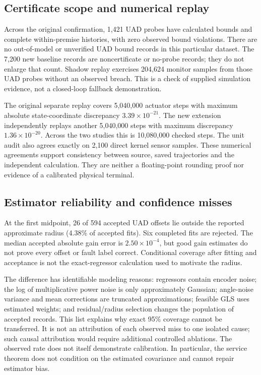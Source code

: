 \subsection{Certificate scope and numerical replay}
Across the original confirmation, 1,421 UAD probes have calculated bounds and complete within-premise histories, with zero observed bound violations. There are no out-of-model or unverified UAD bound records in this particular dataset. The 7,200 new baseline records are noncertificate or no-probe records; they do not enlarge that count. Shadow replay exercises 204,624 monitor samples from those UAD probes without an observed breach. This is a check of supplied simulation evidence, not a closed-loop fallback demonstration.

The original separate replay covers 5,040,000 actuator steps with maximum absolute state-coordinate discrepancy $3.39\times10^{-21}$. The new extension independently replays another 5,040,000 steps with maximum discrepancy $1.36\times10^{-20}$. Across the two studies this is 10,080,000 checked steps. The unit audit also agrees exactly on 2,100 direct kernel sensor samples. These numerical agreements support consistency between source, saved trajectories and the independent calculation. They are neither a floating-point rounding proof nor evidence of a calibrated physical terminal.

\subsection{Estimator reliability and confidence misses}
At the first midpoint, 26 of 594 accepted UAD offsets lie outside the reported approximate radius (4.38\% of accepted fits). Six completed fits are rejected. The median accepted absolute gain error is $2.50\times10^{-4}$, but good gain estimates do not prove every offset or fault label correct. Conditional coverage after fitting and acceptance is not the exact-regressor calculation used to motivate the radius.

The difference has identifiable modeling reasons: regressors contain encoder noise; the log of multiplicative power noise is only approximately Gaussian; angle-noise variance and mean corrections are truncated approximations; feasible GLS uses estimated weights; and residual/radius selection changes the population of accepted records. This list explains why exact 95\% coverage cannot be transferred. It is not an attribution of each observed miss to one isolated cause; such causal attribution would require additional controlled ablations. The observed rate does not itself demonstrate calibration. In particular, the service theorem does not condition on the estimated covariance and cannot repair estimator bias.

